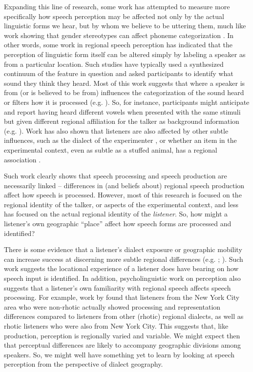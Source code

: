 \documentclass[output=paper]{LSP/langsci}
\begin{document}
Expanding this line of research, some work has attempted to measure more specifically how speech perception may be affected not only by the actual linguistic forms we hear, but by whom we believe to be uttering them, much like work showing that gender stereotypes can affect phoneme categorization \citep{strand_uncovering_1999}. In other words, some work in regional speech perception has indicated that the perception of linguistic form itself can be altered simply by labeling a speaker as from a particular location. Such studies have typically used a synthesized continuum of the feature in question and asked participants to identify what sound they think they heard. Most of this work suggests that where a speaker is from (or is believed to be from) influences the categorization of the sound heard or filters how it is processed (e.g. \citealt{allbritten_sounding_2011, labov_understanding_1997,plichta_/ay/s_2005}). So, for instance, participants might anticipate and report having heard different vowels when presented with the same stimuli but given different regional affiliation for the talker as background information (e.g. \citealt{niedzielski_effect_1999}). Work has also shown that listeners are also affected by other subtle influences, such as the dialect of the experimenter \citep{hay_factors_2006}, or whether an item in the experimental context, even as subtle as a stuffed animal, has a regional association \citep{hay_stuffed_2010}.

Such work clearly shows that speech processing and speech production are necessarily linked – differences in (and beliefs about) regional speech production affect how speech is processed. However, most of this research is focused on the regional identity of the talker, or aspects of the experimental context, and less has focused on the actual regional identity of the \textit{listener}. So, how might a listener’s own geographic “place” affect how speech forms are processed and identified?  

There is some evidence that a listener’s dialect exposure or geographic mobility can increase success at discerning more subtle regional differences (e.g. \citealt{clopper_free_2007}; \citealt{evans_vowel_2004}). Such work suggests the locational experience of a listener does have bearing on how speech input is identified. In addition, psycholinguistic work on perception also suggests that a listener’s own familiarity with regional speech affects speech processing. For example, work by \citet{sumner_effect_2009} found that listeners from the New York City area who were non-rhotic actually showed processing and representation differences compared to listeners from other (rhotic) regional dialects, as well as rhotic listeners who were also from New York City. This suggests that, like production, perception is regionally varied and variable. We might expect then that perceptual differences are likely to accompany geographic divisions among speakers. So, we might well have something yet to learn by looking at speech perception from the perspective of dialect geography. 
\end{document}
